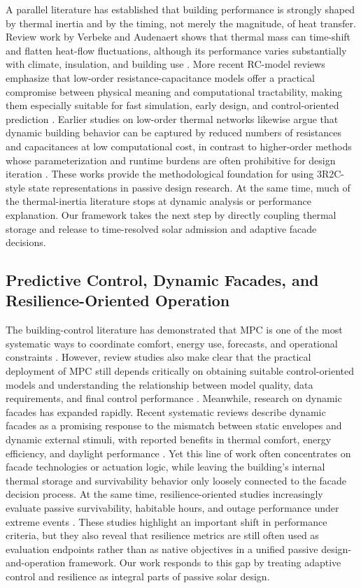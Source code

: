 \documentclass[5p,times,twocolumn]{elsarticle}
\begin{document}
A parallel literature has established that building performance is strongly shaped by thermal inertia and by the timing, not merely the magnitude, of heat transfer. Review work by Verbeke and Audenaert shows that thermal mass can time-shift and flatten heat-flow fluctuations, although its performance varies substantially with climate, insulation, and building use \cite{verbeke2018}. More recent RC-model reviews emphasize that low-order resistance-capacitance models offer a practical compromise between physical meaning and computational tractability, making them especially suitable for fast simulation, early design, and control-oriented prediction \cite{yang2024}. Earlier studies on low-order thermal networks likewise argue that dynamic building behavior can be captured by reduced numbers of resistances and capacitances at low computational cost, in contrast to higher-order methods whose parameterization and runtime burdens are often prohibitive for design iteration \cite{lauster2014}. These works provide the methodological foundation for using 3R2C-style state representations in passive design research. At the same time, much of the thermal-inertia literature stops at dynamic analysis or performance explanation. Our framework takes the next step by directly coupling thermal storage and release to time-resolved solar admission and adaptive facade decisions.

\subsection{Predictive Control, Dynamic Facades, and Resilience-Oriented Operation}

The building-control literature has demonstrated that MPC is one of the most systematic ways to coordinate comfort, energy use, forecasts, and operational constraints \cite{drgona2020}. However, review studies also make clear that the practical deployment of MPC still depends critically on obtaining suitable control-oriented models and understanding the relationship between model quality, data requirements, and final control performance \cite{zhan2021}. Meanwhile, research on dynamic facades has expanded rapidly. Recent systematic reviews describe dynamic facades as a promising response to the mismatch between static envelopes and dynamic external stimuli, with reported benefits in thermal comfort, energy efficiency, and daylight performance \cite{goncalves2024}. Yet this line of work often concentrates on facade technologies or actuation logic, while leaving the building's internal thermal storage and survivability behavior only loosely connected to the facade decision process. At the same time, resilience-oriented studies increasingly evaluate passive survivability, habitable hours, and outage performance under extreme events \cite{hong2023,ismail2023}. These studies highlight an important shift in performance criteria, but they also reveal that resilience metrics are still often used as evaluation endpoints rather than as native objectives in a unified passive design-and-operation framework. Our work responds to this gap by treating adaptive control and resilience as integral parts of passive solar design.
\end{document}
